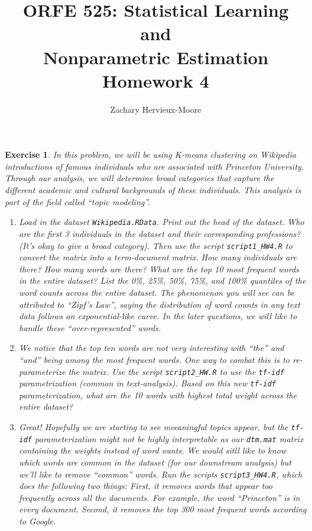 \documentclass[12pt]{article}
\title{ORFE 525: Statistical Learning and \\ Nonparametric Estimation \\ Homework 4}
\author{Zachary Hervieux-Moore}
\date{\displaydate{date}}
\theoremstyle{colon}
\newtheorem{exercise}{Exercise}
\begin{document}
\maketitle

\clearpage

\begin{exercise}
  In this problem, we will be using K-means clustering on Wiki\-pedia introductions of famous individuals who are associated with Princeton University. Through our analysis, we will determine broad categories that capture the different academic and cultural backgrounds of these individuals. This analysis is part of the field called ``topic modeling''.

  \begin{enumerate}[label=\arabic*)]
    \item Load in the dataset \texttt{Wikipedia.RData}. Print out the head of the dataset. Who are the first 3 individuals in the dataset and their corresponding professions? (It's okay to give a broad category). Then use the script \texttt{script1\_HW4.R} to convert the matrix into a term-document matrix. How many individuals are there? How many words are there? What are the top 10 most frequent words in the entire dataset? List the 0\%, 25\%, 50\%, 75\%, and 100\% quantiles of the word counts across the entire dataset. The phenomenon you will see can be attributed to ``Zipf's Law'', saying the distribution of word counts in any text data follows an exponential-like curve. In the later questions, we will like to handle these ``over-represented'' words.

    \item We notice that the top ten words are not very interesting with ``the'' and ``and'' being among the most frequent words. One way to combat this is to re-parameterize the matrix. Use the script \texttt{script2\_HW.R} to use the \texttt{tf-idf} parametrization (common in text-analysis). Based on this new \texttt{tf-idf} parameterization, what are the 10 words with highest total weight across the entire dataset?

    \item Great! Hopefully we are starting to see meeaningful topics appear, but the \texttt{tf-idf} parameterization might not be highly interpretable as our \texttt{dtm.mat} matrix containing the weights instead of word ounts. We would sitll like to know which words are common in the dataset (for our downstream analysis) but we'll like to remove ``common'' words. Run the scripts \texttt{script3\_HW4.R}, which does the following two things: First, it removes words that appear too frequently across all the documents. For example, the word ``Princeton'' is in every document. Second, it removes the top 300 most frequent words according to Google.


\end{enumerate}
\end{exercise}
\end{document}

